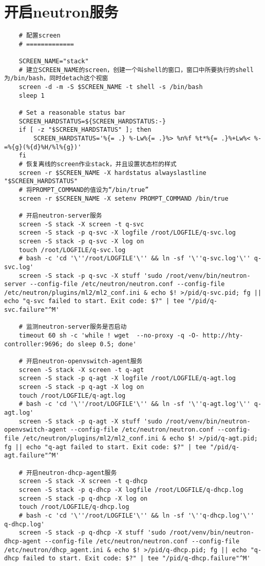 \documentclass[a4paper,left=1.5cm,right=1.5cm,11pt]{article}
\begin{document}
\section{开启neutron服务}
	\begin{lstlisting}
	# 配置screen
	# =============
	
	SCREEN_NAME="stack"
	# 建立SCREEN_NAME的screen，创建一个叫shell的窗口，窗口中所要执行的shell为/bin/bash，同时detach这个视窗
	screen -d -m -S $SCREEN_NAME -t shell -s /bin/bash
    sleep 1

    # Set a reasonable status bar
    SCREEN_HARDSTATUS=${SCREEN_HARDSTATUS:-}
    if [ -z "$SCREEN_HARDSTATUS" ]; then
        SCREEN_HARDSTATUS='%{= .} %-Lw%{= .}%> %n%f %t*%{= .}%+Lw%< %-=%{g}(%{d}%H/%l%{g})'
    fi
	# 恢复离线的screen作业stack，并且设置状态栏的样式
    screen -r $SCREEN_NAME -X hardstatus alwayslastline "$SCREEN_HARDSTATUS"
	# 将PROMPT_COMMAND的值设为“/bin/true”
    screen -r $SCREEN_NAME -X setenv PROMPT_COMMAND /bin/true

	# 开启neutron-server服务
	screen -S stack -X screen -t q-svc
	screen -S stack -p q-svc -X logfile /root/LOGFILE/q-svc.log
    screen -S stack -p q-svc -X log on
	touch /root/LOGFILE/q-svc.log
    # bash -c 'cd '\''/root/LOGFILE'\'' && ln -sf '\''q-svc.log'\'' q-svc.log'
	screen -S stack -p q-svc -X stuff 'sudo /root/venv/bin/neutron-server --config-file /etc/neutron/neutron.conf --config-file /etc/neutron/plugins/ml2/ml2_conf.ini & echo $! >/pid/q-svc.pid; fg || echo "q-svc failed to start. Exit code: $?" | tee "/pid/q-svc.failure"^M'

	# 监测neutron-server服务是否启动
	timeout 60 sh -c 'while ! wget  --no-proxy -q -O- http://hty-controller:9696; do sleep 0.5; done'

	# 开启neutron-openvswitch-agent服务
	screen -S stack -X screen -t q-agt
	screen -S stack -p q-agt -X logfile /root/LOGFILE/q-agt.log
    screen -S stack -p q-agt -X log on
	touch /root/LOGFILE/q-agt.log
    # bash -c 'cd '\''/root/LOGFILE'\'' && ln -sf '\''q-agt.log'\'' q-agt.log'
	screen -S stack -p q-agt -X stuff 'sudo /root/venv/bin/neutron-openvswitch-agent --config-file /etc/neutron/neutron.conf --config-file /etc/neutron/plugins/ml2/ml2_conf.ini & echo $! >/pid/q-agt.pid; fg || echo "q-agt failed to start. Exit code: $?" | tee "/pid/q-agt.failure"^M'

	# 开启neutron-dhcp-agent服务
	screen -S stack -X screen -t q-dhcp
	screen -S stack -p q-dhcp -X logfile /root/LOGFILE/q-dhcp.log
    screen -S stack -p q-dhcp -X log on
	touch /root/LOGFILE/q-dhcp.log
    # bash -c 'cd '\''/root/LOGFILE'\'' && ln -sf '\''q-dhcp.log'\'' q-dhcp.log'
	screen -S stack -p q-dhcp -X stuff 'sudo /root/venv/bin/neutron-dhcp-agent --config-file /etc/neutron/neutron.conf --config-file /etc/neutron/dhcp_agent.ini & echo $! >/pid/q-dhcp.pid; fg || echo "q-dhcp failed to start. Exit code: $?" | tee "/pid/q-dhcp.failure"^M'


\end{lstlisting}
\end{document}
